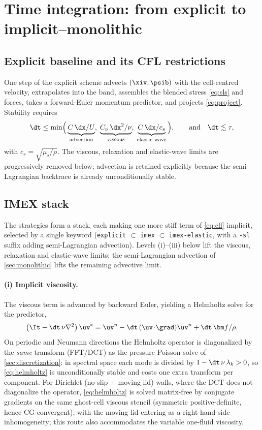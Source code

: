 \section{Time integration: from explicit to implicit--monolithic}
\label{sec:time}

\subsection{Explicit baseline and its CFL restrictions}
One step of the explicit scheme advects $(\xiv,\psib)$ with the cell-centred velocity,
extrapolates into the band, assembles the blended stress \cref{eq:sls} and forces, takes
a forward-Euler momentum predictor, and projects \cref{eq:project}. Stability requires
\begin{equation}
\dt \le \min\!\Big(
\underbrace{C\,\dx/U}_{\text{advection}},\;
\underbrace{C_\nu\,\dx^2/\nu}_{\text{viscous}},\;
\underbrace{C\,\dx/c_s}_{\text{elastic wave}}\Big),
\qquad \text{and}\quad \dt\lesssim\tau,
\label{eq:cfl}
\end{equation}
with $c_s=\sqrt{\mu_s/\rho}$. The viscous, relaxation and elastic-wave limits are
progressively removed below; advection is retained explicitly because the
semi-Lagrangian backtrace is already unconditionally stable.

\subsection{IMEX stack}
The strategies form a stack, each making one more stiff term of \cref{eq:cfl} implicit,
selected by a single keyword (\texttt{explicit} $\subset$ \texttt{imex} $\subset$
\texttt{imex-elastic}, with a \texttt{-sl} suffix adding semi-Lagrangian advection).
Levels (i)--(iii) below lift the viscous, relaxation and elastic-wave limits; the
semi-Lagrangian advection of \cref{sec:monolithic} lifts the remaining advective limit.

\paragraph{(i) Implicit viscosity.} The viscous term is advanced by backward Euler,
yielding a Helmholtz solve for the predictor,
\begin{equation}
\left(\It-\dt\,\nu\nabla^2\right)\uv^{*}
   = \uv^{n} - \dt\,(\uv\!\cdot\!\grad)\uv^{n} + \dt\,\bm f/\rho .
\label{eq:helmholtz}
\end{equation}
On periodic and Neumann directions the Helmholtz operator is diagonalized by the
\emph{same} transform (FFT/DCT) as the pressure Poisson solve of
\cref{sec:discretization}: in spectral space each mode is divided by
$1-\dt\,\nu\,\lambda_k>0$, so \cref{eq:helmholtz} is unconditionally stable and costs one
extra transform per component. For Dirichlet (no-slip $+$ moving lid) walls, where the
DCT does not diagonalize the operator, \cref{eq:helmholtz} is solved matrix-free by
conjugate gradients on the same ghost-cell viscous stencil (symmetric positive-definite,
hence CG-convergent), with the moving lid entering as a right-hand-side inhomogeneity;
this route also accommodates the variable one-fluid viscosity.

